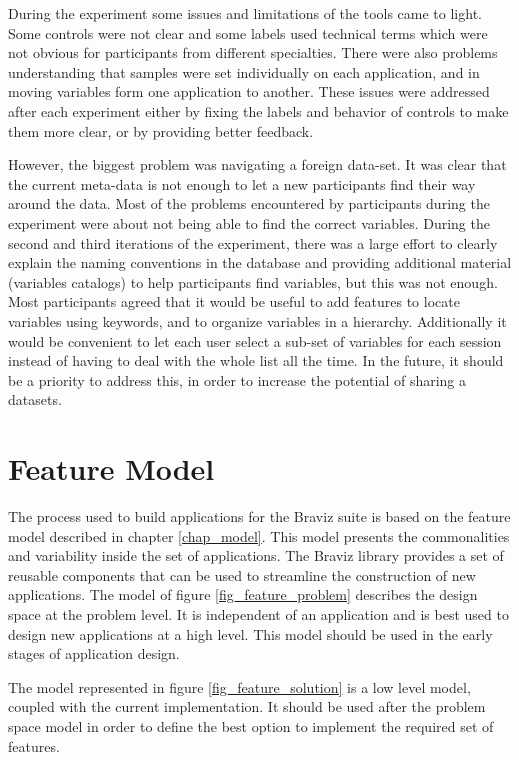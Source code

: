 During the experiment some issues and limitations of the tools came to light. Some controls were not clear and some labels used technical terms which were not obvious for participants from different specialties. There were also problems understanding that samples were set individually on each application, and in moving variables form one application to another. These issues were addressed after each experiment either by fixing the labels and behavior of controls to make them more clear, or by providing better feedback. 

However, the biggest problem was navigating a foreign data-set. It was clear that the current meta-data is not enough to let a new participants find their way around the data. Most of the problems encountered by participants during the experiment were about not being able to find the correct variables. During the second and third iterations of the experiment, there was a large effort to clearly explain the naming conventions in the database and providing additional material (variables catalogs) to help participants find variables, but this was not enough. Most participants agreed that it would be useful to add features to locate variables using keywords, and to organize variables in a hierarchy. Additionally it would be convenient to let each user select a sub-set of variables for each session instead of having to deal with the whole list all the time. In the future, it should be a priority to address this, in order to increase the potential of sharing a datasets.


\section{Feature Model}


The process used to build applications for the Braviz suite is based on the feature model described in chapter \ref{chap_model}. This model presents the commonalities and variability inside the set of applications. The Braviz library provides a set of reusable components that can be used to streamline the construction of new applications. The model of figure \ref{fig_feature_problem} describes the design space at the problem level. It is independent of an application and is best used to design new applications at a high level. This model should be used in the early stages of application design. 

The model represented in figure \ref{fig_feature_solution} is a low level model, coupled with the current implementation. It should be used after the problem space model in order to define the best option to implement the required set of features. 


